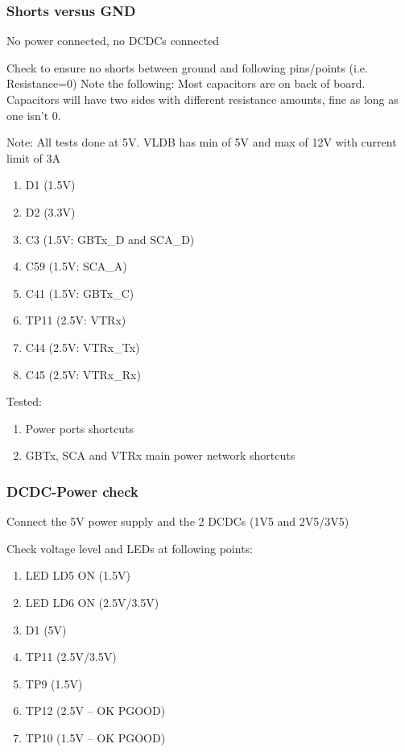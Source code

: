 \subsubsection{Shorts versus GND}

No power connected, no DCDCs connected

Check to ensure no shorts between ground and following pins/points (i.e. Resistance=0)
Note the following: Most capacitors are on back of board. Capacitors will have two sides with different resistance amounts, fine as long as one isn't 0.

Note: All tests done at 5V. VLDB has min of 5V and max of 12V with current limit of 3A

\begin{enumerate}
    \item D1 (1.5V)
    \item D2 (3.3V)
    \item C3 (1.5V: GBTx\_D and SCA\_D)
    \item C59 (1.5V: SCA\_A)
    \item C41 (1.5V: GBTx\_C)
    \item TP11 (2.5V: VTRx)
    \item C44 (2.5V: VTRx\_Tx)
    \item C45 (2.5V: VTRx\_Rx)
\end{enumerate}

Tested:
\begin{enumerate}
    \item Power ports shortcuts
    \item GBTx, SCA and VTRx main power network shortcuts
\end{enumerate}


\subsubsection{DCDC-Power check}

Connect the 5V power supply and the 2 DCDCs (1V5 and 2V5/3V5)

Check voltage level and LEDs at following points:

\begin{enumerate}
    \item LED LD5 ON (1.5V)
    \item LED LD6 ON (2.5V/3.5V)
    \item D1 (5V)
    \item TP11 (2.5V/3.5V)
    \item TP9 (1.5V)
    \item TP12 (2.5V – OK PGOOD)
    \item TP10 (1.5V – OK PGOOD)
\end{enumerate}

